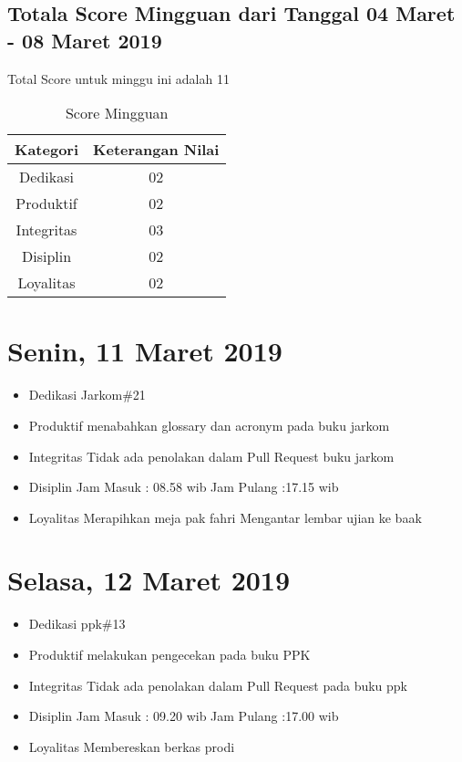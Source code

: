 \subsection{Totala Score Mingguan dari Tanggal 04 Maret - 08 Maret 2019}
Total Score untuk minggu ini adalah 11

\begin{table}[h]
\caption{Score Mingguan}
\centering
\begin{tabular}{|c|c|}
\hline
\textbf{Kategori}&\textbf{Keterangan Nilai}\\
\hline
Dedikasi&02\\
\hline
Produktif&02\\
\hline
Integritas&03\\
\hline
Disiplin&02\\
\hline
Loyalitas&02\\
\hline
\end{tabular}
\label{table:score mingguan}
\end{table}


\section{Senin, 11 Maret 2019}
\begin{itemize}
\item Dedikasi
\subitem Jarkom\#21
\item Produktif
  \subitem menabahkan glossary dan acronym pada buku jarkom
\item Integritas
  \subitem Tidak ada penolakan dalam Pull Request buku jarkom
\item Disiplin
  \subitem Jam Masuk : 08.58 wib
  \subitem Jam Pulang :17.15 wib
\item Loyalitas
  \subitem Merapihkan meja pak fahri
  \subitem Mengantar lembar ujian ke baak
\end{itemize}

\section{Selasa, 12 Maret 2019}
\begin{itemize}
\item Dedikasi
\subitem ppk\#13
\item Produktif
  \subitem melakukan pengecekan pada buku PPK
\item Integritas
  \subitem Tidak ada penolakan dalam Pull Request pada buku ppk
\item Disiplin
  \subitem Jam Masuk : 09.20 wib
  \subitem Jam Pulang :17.00 wib
\item Loyalitas
  \subitem Membereskan berkas prodi
\end{itemize}

